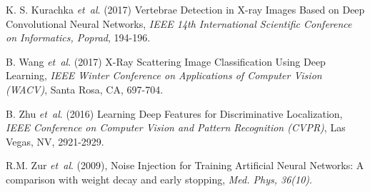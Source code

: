 \documentclass{bioinfo}
\begin{document}
\begin{thebibliography}{}
K. S. Kurachka {\it et~al}.  (2017) Vertebrae Detection in X-ray Images Based on Deep Convolutional Neural Networks, {\it IEEE 14th International Scientific Conference on Informatics, Poprad}, 194-196.

B. Wang {\it et~al}. (2017) X-Ray Scattering Image Classification Using Deep Learning, {\it IEEE Winter Conference on Applications of Computer Vision (WACV)}, Santa Rosa, CA,  697-704.


B. Zhu {\it et~al}. (2016) Learning Deep Features for Discriminative Localization, {\it IEEE Conference on Computer Vision and Pattern Recognition (CVPR)}, Las Vegas, NV, 2921-2929.

R.M. Zur {\it et~al}. (2009), Noise Injection for Training Artificial Neural Networks: A comparison with weight decay and early stopping, {\it Med. Phys, 36(10)}.


\end{thebibliography}
\end{document}
